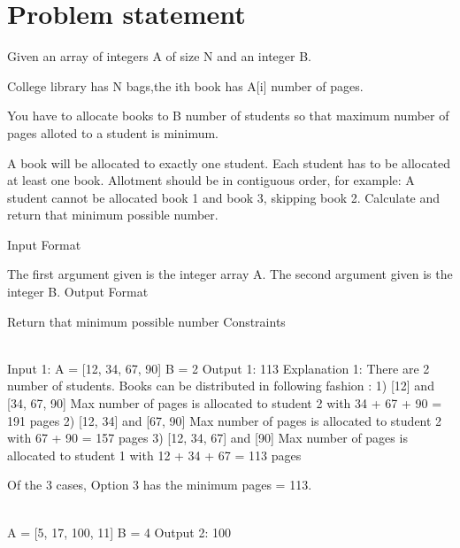 \section{Problem statement}
\begin{exercise}
\label{example:allocate_books:exercice1}
Given an array of integers A of size N and an integer B.

College library has N bags,the ith book has A[i] number of pages.

You have to allocate books to B number of students so that maximum number of pages alloted to a student is minimum.

A book will be allocated to exactly one student.
Each student has to be allocated at least one book.
Allotment should be in contiguous order, for example: A student cannot be allocated book 1 and book 3, skipping book 2.
Calculate and return that minimum possible number.



Input Format

The first argument given is the integer array A.
The second argument given is the integer B.
Output Format

Return that minimum possible number
Constraints




	\begin{example}
		\label{example:allocate_books:example1}
		\hfill \\
		
Input 1:
A = [12, 34, 67, 90]
B = 2
Output 1:
113
Explanation 1:
There are 2 number of students. Books can be distributed in following fashion : 
	1) [12] and [34, 67, 90]
	Max number of pages is allocated to student 2 with 34 + 67 + 90 = 191 pages
	2) [12, 34] and [67, 90]
	Max number of pages is allocated to student 2 with 67 + 90 = 157 pages 
	3) [12, 34, 67] and [90]
	Max number of pages is allocated to student 1 with 12 + 34 + 67 = 113 pages

	Of the 3 cases, Option 3 has the minimum pages = 113.
		
	\end{example}

	\begin{example}
		\label{example:allocate_books:example2}
		\hfill \\
    A = [5, 17, 100, 11]
    B = 4
Output 2:
    100
	\end{example}


\end{exercise}

